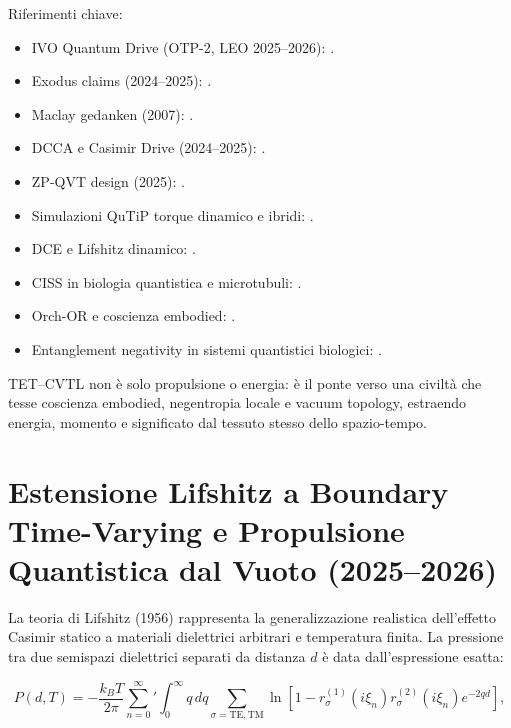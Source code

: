 \documentclass[11pt,a4paper]{article}
\let\oldcite\cite
\renewcommand{\cite}{\protect\oldcite}
\theoremstyle{plain}
\theoremstyle{definition}
\begin{document}
\vspace{0.3cm}

Riferimenti chiave:
\begin{itemize}
\item IVO Quantum Drive (OTP-2, LEO 2025–2026): \cite{IVO2026}.
\item Exodus claims (2024–2025): \cite{BuhlerAPEC2025, BuhlerDebrief2024}.
\item Maclay gedanken (2007): \cite{Maclay2007}.
\item DCCA e Casimir Drive (2024–2025): \cite{CasimirDrive2024}.
\item ZP-QVT design (2025): \cite{ZeinerGundersen2025}.
\item Simulazioni QuTiP torque dinamico e ibridi: \cite{PhysSoliman2026a, PhysSoliman2026b}.
\item DCE e Lifshitz dinamico: \cite{Wilson2011, Lahteenmaki2013}.
\item CISS in biologia quantistica e microtubuli: \cite{Kumar2026, Rana2025}.
\item Orch-OR e coscienza embodied: \cite{HameroffPenrose2014, Beshkar2025}.
\item Entanglement negativity in sistemi quantistici biologici: \cite{Wiest2025, Perry2026}.
\end{itemize}

TET–CVTL non è solo propulsione o energia: è il ponte verso una civiltà che tesse coscienza embodied, negentropia locale e vacuum topology, estraendo energia, momento e significato dal tessuto stesso dello spazio-tempo.










\section{Estensione Lifshitz a Boundary Time-Varying e Propulsione Quantistica dal Vuoto (2025--2026)}
\label{sec:lifshitz-time-varying}

La teoria di Lifshitz (1956) rappresenta la generalizzazione realistica dell'effetto Casimir statico a materiali dielettrici arbitrari e temperatura finita. La pressione tra due semispazi dielettrici separati da distanza $d$ è data dall'espressione esatta:

\begin{equation}
P(d,T) = -\frac{k_B T}{2\pi} \sum_{n=0}^\infty{}' \int_0^\infty q \, dq \sum_{\sigma=\mathrm{TE,TM}} \ln \left[1 - r_\sigma^{(1)}(i\xi_n) r_\sigma^{(2)}(i\xi_n) e^{-2 q d}\right],
\label{eq:lifshitz-standard}
\end{equation}
\end{document}
